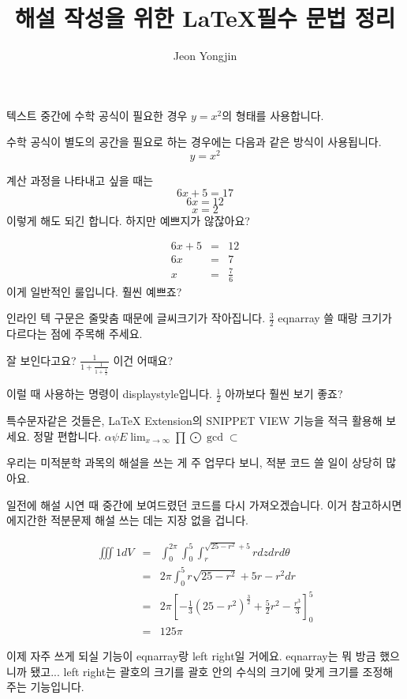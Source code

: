 \documentclass{article}
\author{Jeon Yongjin}
\title{해설 작성을 위한 \LaTeX 필수 문법 정리}
\date{}
\begin{document}
\maketitle

텍스트 중간에 수학 공식이 필요한 경우 \( y=x^2 \)의 형태를 사용합니다.

수학 공식이 별도의 공간을 필요로 하는 경우에는 다음과 같은 방식이 사용됩니다. \[ y=x^2 \]

계산 과정을 나타내고 싶을 때는
\[6x + 5 = 17\]
\[6x = 12\]
\[x = 2\]
이렇게 해도 되긴 합니다. 하지만 예쁘지가 않잖아요?

\begin{eqnarray*}
    6x + 5 &=& 12 \\
    6x &=& 7 \\
    x &=& \frac{7}{6}
\end{eqnarray*}
이게 일반적인 룰입니다. 훨씬 예쁘죠?

인라인 텍 구문은 줄맞춤 때문에 글씨크기가 작아집니다. \( \frac{3}{2} \) eqnarray 쓸 때랑 크기가 다르다는 점에 주목해 주세요.

잘 보인다고요? \(\frac{1}{1+\frac{1}{1+\frac{1}{2}}}\) 이건 어때요?

이럴 때 사용하는 명령이 displaystyle입니다. \( \displaystyle \frac{1}{2} \) 아까보다 훨씬 보기 좋죠?

특수문자같은 것들은, LaTeX Extension의 SNIPPET VIEW 기능을 적극 활용해 보세요. 정말 편합니다.
\(\alpha \psi E \lim_{x \to \infty} \prod \bigodot \gcd \subset \)

우리는 미적분학 과목의 해설을 쓰는 게 주 업무다 보니, 적분 코드 쓸 일이 상당히 많아요.

일전에 해설 시연 때 중간에 보여드렸던 코드를 다시 가져오겠습니다. 이거 참고하시면 에지간한 적분문제 해설 쓰는 데는 지장 없을 겁니다.

\begin{eqnarray*}
    \iiint 1 dV &=& \int_{0}^{2\pi} \int_{0}^{5} \int_{r}^{\sqrt{25-r^2}+5} r dz dr d\theta \\
    &=& 2\pi \int_{0}^{5} r\sqrt{25-r^2} + 5r -r^2 dr \\
    &=& 2\pi \left[ -\frac{1}{3}(25-r^2)^{\frac{3}{2}} + \frac{5}{2}r^2 - \frac{r^3}{3} \right]_{0}^{5} \\
    &=& 125\pi
\end{eqnarray*}

이제 자주 쓰게 되실 기능이 eqnarray랑 left right일 거에요. eqnarray는 뭐 방금 했으니까 됐고...
left right는 괄호의 크기를 괄호 안의 수식의 크기에 맞게 크기를 조정해 주는 기능입니다.
    
\end{document}

